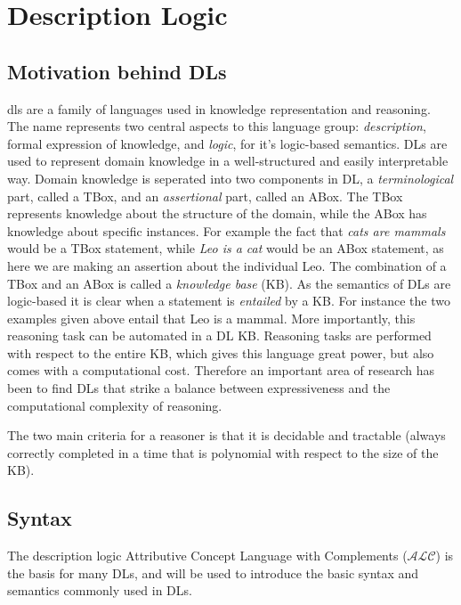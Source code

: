 \chapter{Description Logic}


\section{Motivation behind DLs}
\gls{dls} are a family of languages used in knowledge representation and reasoning. The name represents two central aspects to this language group: \emph{description}, formal expression of knowledge, and  \emph{logic}, for it's logic-based semantics. DLs are used to represent domain knowledge in a well-structured and easily interpretable way. Domain knowledge is seperated into two components in DL, a \emph{terminological} part, called a TBox, and an \emph{assertional} part, called an ABox. The TBox represents knowledge about the structure of the domain, while the ABox has knowledge about specific instances. For example the fact that \emph{cats are  mammals} would be a TBox statement, while \emph{Leo is a cat} would be an ABox statement, as here we are making an assertion about the individual Leo. The combination of a TBox and an ABox is called a \emph{knowledge base} (KB).
As the semantics of DLs are logic-based it is clear when a statement is \emph{entailed} by a KB. For instance the two examples given above entail that Leo is a mammal. More importantly, this reasoning task can be automated in a DL KB. Reasoning tasks are performed with respect to the entire KB, which gives this language great power, but also comes with a computational cost. Therefore an important area of research has been to find DLs that strike a balance between expressiveness and the computational complexity of reasoning.


The two main criteria for a reasoner is that it is decidable and tractable (always correctly completed in a time that is polynomial with respect to the size of the KB).

\section{Syntax}
The description logic Attributive Concept Language with Complements ($\mathcal{ALC}$) is the basis for many DLs, and will be used to introduce the basic syntax and semantics commonly used in DLs.

